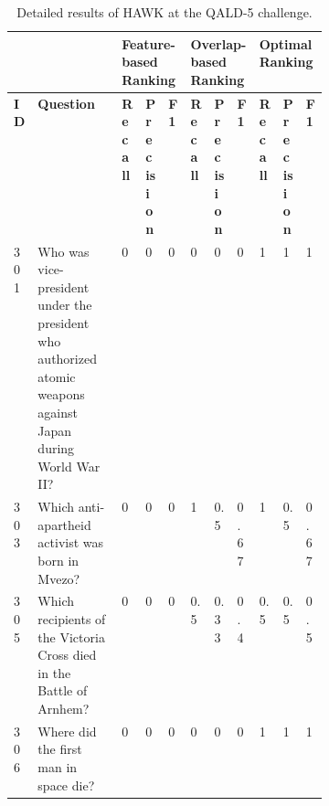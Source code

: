 \documentclass{llncs}
\begin{document}
\begin{table}[h]
\centering
\caption{Detailed results of HAWK at the QALD-5 challenge.}
\scriptsize
\begin{tabular}{@{}lp{0.4\linewidth}lllllllll@{}}
\toprule
         &                                                                                                             & \multicolumn{3}{l}{{\bf Feature-based Ranking}}     & \multicolumn{3}{l}{{\bf Overlap-based Ranking}}                                   & \multicolumn{3}{l}{{\bf Optimal Ranking}}                                      \\ \midrule
{\bf ID} & {\bf Question}                                                                                              & {\bf Recall}                & {\bf Precision}              & {\bf F1}             & {\bf Recall}              & {\bf Precision}           & {\bf F1}          & {\bf Recall}             & {\bf Precision}          & {\bf F1}         \\\midrule
301      & Who was vice-president under the president who authorized atomic weapons against Japan during World War II? & \cellcolor[HTML]{FFFE65}0   & \cellcolor[HTML]{FFFE65}0    & \cellcolor[HTML]{FFFE65}0    & \cellcolor[HTML]{FFFE65}0 & \cellcolor[HTML]{FFFE65}0 & \cellcolor[HTML]{FFFE65}0 & 1                        & 1                        & 1                        \\
303      & Which anti-apartheid activist was born in Mvezo?                                                            & \cellcolor[HTML]{F8A102}0   & \cellcolor[HTML]{F8A102}0    & \cellcolor[HTML]{F8A102}0    & 1                         & 0.5                       & 0.67                      & 1                        & 0.5                      & 0.67                     \\
305      & Which recipients of the Victoria Cross died in the Battle of Arnhem?                                        & \cellcolor[HTML]{F8A102}0   & \cellcolor[HTML]{F8A102}0    & \cellcolor[HTML]{F8A102}0    & 0.5                       & 0.33                      & 0.4                       & 0.5                      & 0.5                      & 0.5                      \\
306      & Where did the first man in space die?                                                                       & \cellcolor[HTML]{FFFE65}0   & \cellcolor[HTML]{FFFE65}0    & \cellcolor[HTML]{FFFE65}0    & \cellcolor[HTML]{FFFE65}0 & \cellcolor[HTML]{FFFE65}0 & \cellcolor[HTML]{FFFE65}0 & 1                        & 1                        & 1                        \\

\end{tabular}
\end{table}
\end{document}
